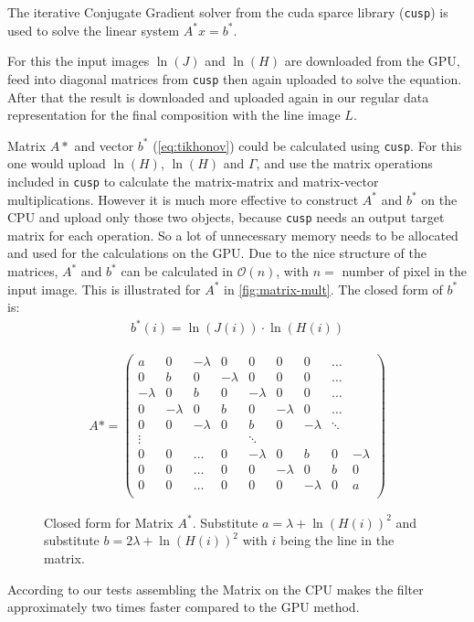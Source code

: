 The iterative Conjugate Gradient solver from the cuda sparce library
(\texttt{cusp}) is used to solve the linear system $A^* x = b^*$.

For this the input images $\ln(J)$ and $\ln(H)$ are downloaded from the GPU,
feed into diagonal matrices from \texttt{cusp} then again uploaded to solve the
equation. After that the result is downloaded and uploaded again in our regular
data representation for the final composition with the line image $L$.

Matrix $A*$ and vector $b^*$ (\autoref{eq:tikhonov}) could be calculated using
\texttt{cusp}. For this one would upload $\ln(H)$, $\ln(H)$ and $\Gamma$, and
use the matrix operations included in \texttt{cusp} to calculate the
matrix-matrix and matrix-vector multiplications. However it is much more
effective to construct $A^*$ and $b^*$ on the CPU and upload only those two
objects, because \texttt{cusp} needs an output target matrix for each operation.
So a lot of unnecessary memory needs to be allocated and used for the
calculations on the GPU. Due to the nice structure of the matrices, $A^*$ and
$b^*$  can be
calculated in $\mathcal{O}(n)$, with $n =$ number of pixel in the input image.
This is illustrated for $A^*$ in \autoref{fig:matrix-mult}. The closed form of
$b^*$ is:
\begin{align*}
  b^*(i) = \ln(J(i)) \cdot \ln(H(i))
\end{align*}

\begin{figure}[htb]
  \centering
  {\small
  \begin{align*}
    A*= \begin{pmatrix}
      a & 0 & -\lambda & 0 & 0 & 0 & 0 & \dots\\
      0 & b & 0 & -\lambda & 0 & 0 & 0 & \dots\\
      -\lambda & 0 & b & 0 & -\lambda & 0 & 0 & \dots\\
      0 & -\lambda & 0 & b & 0 & -\lambda & 0 & \dots\\
      0 & 0 & -\lambda & 0 & b & 0 & -\lambda & \ddots\\
      \vdots& &  &  &\ddots  \\
      0 & 0 & \dots & 0 & -\lambda & 0 & b & 0 & -\lambda\\
      0 & 0 & \dots & 0 & 0 &-\lambda & 0 & b & 0\\
      0 & 0 & \dots & 0 & 0 & 0 &-\lambda & 0 & a \\
    \end{pmatrix}
  \end{align*}
}
  \caption{Closed form for Matrix $A^*$. Substitute $a = \lambda +
  \ln(H(i))^2$ and substitute $b = 2\lambda + \ln(H(i))^2$ with $i$ being the line
in the matrix.}
  \label{fig:matrix-mult}
\end{figure}

According to our tests assembling the Matrix on the CPU makes the filter
approximately two times faster compared to the GPU method.
